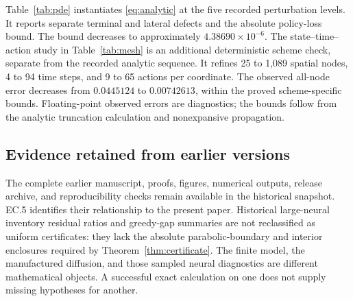 Table~\ref{tab:pde} instantiates \eqref{eq:analytic} at the five recorded perturbation levels. It reports separate terminal and lateral defects and the absolute policy-loss bound. The bound decreases to approximately $4.38690\times10^{-6}$. The state--time--action study in Table~\ref{tab:mesh} is an additional deterministic scheme check, separate from the recorded analytic sequence. It refines 25 to 1,089 spatial nodes, 4 to 94 time steps, and 9 to 65 actions per coordinate. The observed all-node error decreases from $0.0445124$ to $0.00742613$, within the proved scheme-specific bounds. Floating-point observed errors are diagnostics; the bounds follow from the analytic truncation calculation and nonexpansive propagation.

\subsection{Evidence retained from earlier versions}
The complete earlier manuscript, proofs, figures, numerical outputs, release archive, and reproducibility checks remain available in the historical snapshot. EC.5 identifies their relationship to the present paper. Historical large-neural inventory residual ratios and greedy-gap summaries are not reclassified as uniform certificates: they lack the absolute parabolic-boundary and interior enclosures required by Theorem~\ref{thm:certificate}. The finite model, the manufactured diffusion, and those sampled neural diagnostics are different mathematical objects. A successful exact calculation on one does not supply missing hypotheses for another.

